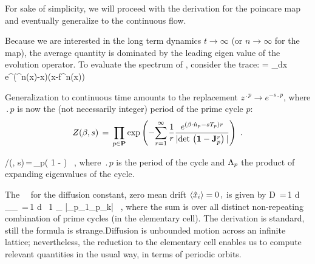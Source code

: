 For sake of simplicity, we will proceed with the derivation for the
poincare map and eventually generalize to the continuous flow.

Because we are interested in the long term dynamics $t\to\infty$ (or
$n\to\infty$ for the map), the average quantity is dominated by the
leading eigen value of the evolution operator. To evaluate the spectrum of
, consider the trace:
\beq
{} = \int_{\pS}dx ~
e^{\beta\cdot(^n(x)-x)}\delta(x-f^n(x))
\eeq

Generalization to continuous time amounts to the
replacement
$ z^{\period{p}} \rightarrow e^{-s \period{p}} $, where $\period{p}$
is now the (not necessarily integer)
period of the prime cycle $p$:
$$
Z(\beta,s)\,=\,\prod_{p\in\PP} \exp \left( - {
 \sum_{r=1}^\infty {1 \over r}
 { e^{(\beta \cdot \hn_p- s \period{p}) r } %
 \over { | \det \left( {\bf 1}-{\bf J}_p^{r} \right) | } }
 } \right)
\,\, .
$$


/\zeta(\beta, s)\,=\,\prod_{p}\left( 1 -  \right) ~,
\label{zeta-diff}
\eeq
where $\period{p}$ is the period of the cycle and $\Lambda_p$ the
product of expanding eigenvalues of the cycle.

The \dzeta\ \cycForm\ for the diffusion constant, zero mean drift
$ \langle { \hat{x}_i } \rangle = 0 \,, $ is given by
 \beq D \,=\,{1  d}
{ _\zeta \over \expct{\period{}}_\zeta } \,=\,{1
   d } \, {1 \over \expct{\period{}}_\zeta} \sumprime
{}
{|\ExpaEig_{p_1}\cdots \ExpaEig_{p_k}|} \, ,
\label{eq-ecDiffCoef}
\eeq
where the sum is over all distinct non-repeating combination of prime
cycles (in the elementary cell). The derivation is standard, still the
formula is strange.Diffusion is unbounded motion across an infinite
lattice; nevertheless, the reduction to the elementary cell enables us to
compute relevant quantities in the usual way, in terms of periodic
orbits.
